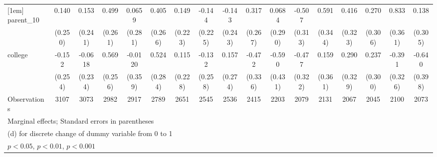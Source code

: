 {\begin{tabular}{l*{16}{c}}
[1em]
parent\_10           &       0.140         &       0.153         &       0.499         &      0.0659         &       0.405         &       0.149         &      -0.144         &      -0.143         &       0.317         &      0.0684         &      -0.507         &       0.591         &       0.416         &       0.270         &       0.833\sym{*}  &       0.138         \\
                    &     (0.250)         &     (0.241)         &     (0.261)         &     (0.281)         &     (0.266)         &     (0.223)         &     (0.225)         &     (0.243)         &     (0.267)         &     (0.290)         &     (0.313)         &     (0.344)         &     (0.323)         &     (0.306)         &     (0.361)         &     (0.305)         \\
[1em]
college             &      -0.152         &     -0.0618         &       0.569\sym{*}  &     -0.0120         &       0.524         &       0.115         &      -0.132         &       0.157         &      -0.472         &      -0.590         &      -0.477         &       0.159         &       0.290         &       0.237         &      -0.391         &      -0.640         \\
                    &     (0.254)         &     (0.234)         &     (0.256)         &     (0.359)         &     (0.284)         &     (0.228)         &     (0.258)         &     (0.274)         &     (0.336)         &     (0.431)         &     (0.322)         &     (0.361)         &     (0.329)         &     (0.300)         &     (0.326)         &     (0.398)         \\
\hline
Observations        &        3107         &        3073         &        2982         &        2917         &        2789         &        2651         &        2545         &        2536         &        2415         &        2203         &        2079         &        2131         &        2067         &        2045         &        2100         &        2073         \\
\hline\hline
\multicolumn{17}{l}{\footnotesize Marginal effects; Standard errors in parentheses}\\
\multicolumn{17}{l}{\footnotesize  (d) for discrete change of dummy variable from 0 to 1}\\
\multicolumn{17}{l}{\footnotesize \sym{*} \(p<0.05\), \sym{**} \(p<0.01\), \sym{***} \(p<0.001\)}\\
\end{tabular}
}

